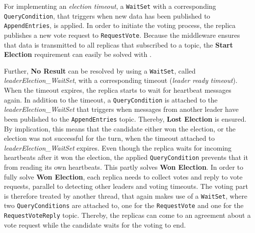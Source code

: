 For implementing an \textit{election timeout}, a \texttt{WaitSet} with a corresponding \texttt{QueryCondition}, that triggers when new data has been published to \texttt{AppendEntries}, is applied.
In order to initiate the voting process, the replica publishes a new vote request to \texttt{RequestVote}.
Because the middleware ensures that data is transmitted to all replicas that subscribed to a topic, the \textbf{Start Election} requirement can easily be solved with .

Further, \textbf{No Result} can be resolved by using a \texttt{WaitSet}, called \textit{leaderElection\_WaitSet}, with a corresponding timeout (\textit{leader ready timeout}).
When the timeout expires, the replica starts to wait for heartbeat messages again.
In addition to the timeout, a \texttt{QueryCondition} is attached to the \textit{leaderElection\_WaitSet} that triggers when messages from another leader have been published to the \texttt{AppendEntries} topic.
Thereby, \textbf{Lost Election} is ensured.
By implication, this means that the candidate either won the election, or the election was not successful for the turn, when the timeout attached to \textit{leaderElection\_WaitSet} expires.
Even though the replica waits for incoming heartbeats after it won the election, the applied \texttt{QueryCondition} prevents that it from reading its own heartbeats.
This partly solves \textbf{Won Election}.
In order to fully solve \textbf{Won Election}, each replica needs to collect votes and reply to vote requests, parallel to detecting other leaders and voting timeouts.
The voting part is therefore treated by another  thread, that again makes use of a \texttt{WaitSet}, where two \texttt{QueryConditions} are attached to, one for the \texttt{RequestVote} and one for the \texttt{RequestVoteReply} topic.
Thereby, the replicas can come to an agreement about a vote request while the candidate waits for the voting to end.

